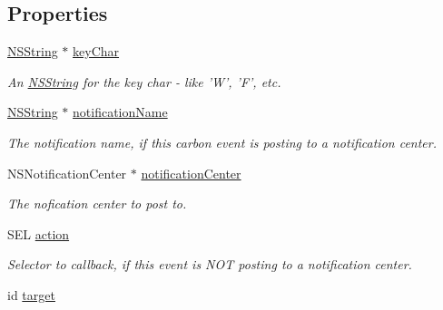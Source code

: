 \subsection*{Properties}
\begin{DoxyCompactItemize}
\item 
\hypertarget{interface_g_d_carbon_event_a6a1d5951550d087504bd446380ec90eb}{
\hyperlink{class_n_s_string}{NSString} $\ast$ \hyperlink{interface_g_d_carbon_event_a6a1d5951550d087504bd446380ec90eb}{keyChar}}
\label{interface_g_d_carbon_event_a6a1d5951550d087504bd446380ec90eb}

\begin{DoxyCompactList}\small\item\em An \hyperlink{class_n_s_string}{NSString} for the key char -\/ like 'W', 'F', etc. \item\end{DoxyCompactList}\item 
\hypertarget{interface_g_d_carbon_event_a5820e6b5f9552f7202f7d6608b93cda0}{
\hyperlink{class_n_s_string}{NSString} $\ast$ \hyperlink{interface_g_d_carbon_event_a5820e6b5f9552f7202f7d6608b93cda0}{notificationName}}
\label{interface_g_d_carbon_event_a5820e6b5f9552f7202f7d6608b93cda0}

\begin{DoxyCompactList}\small\item\em The notification name, if this carbon event is posting to a notification center. \item\end{DoxyCompactList}\item 
\hypertarget{interface_g_d_carbon_event_aab9901af8082c9a5b68340bf6df42dc5}{
NSNotificationCenter $\ast$ \hyperlink{interface_g_d_carbon_event_aab9901af8082c9a5b68340bf6df42dc5}{notificationCenter}}
\label{interface_g_d_carbon_event_aab9901af8082c9a5b68340bf6df42dc5}

\begin{DoxyCompactList}\small\item\em The nofication center to post to. \item\end{DoxyCompactList}\item 
\hypertarget{interface_g_d_carbon_event_a1ab5a6cf85131499d75d62cee6b5be57}{
SEL \hyperlink{interface_g_d_carbon_event_a1ab5a6cf85131499d75d62cee6b5be57}{action}}
\label{interface_g_d_carbon_event_a1ab5a6cf85131499d75d62cee6b5be57}

\begin{DoxyCompactList}\small\item\em Selector to callback, if this event is NOT posting to a notification center. \item\end{DoxyCompactList}\item 
\hypertarget{interface_g_d_carbon_event_aedcfcd101bf6650ae61b6aa4ef8312a2}{
id \hyperlink{interface_g_d_carbon_event_aedcfcd101bf6650ae61b6aa4ef8312a2}{target}}
\label{interface_g_d_carbon_event_aedcfcd101bf6650ae61b6aa4ef8312a2}


\end{DoxyCompactItemize}
